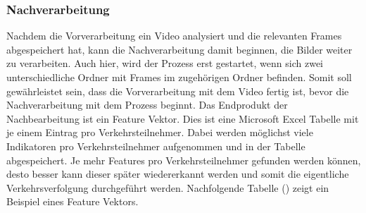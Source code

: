 \subsubsection{Nachverarbeitung}
Nachdem die Vorverarbeitung ein Video analysiert und die relevanten Frames abgespeichert hat, kann die Nachverarbeitung damit beginnen, die Bilder weiter zu verarbeiten. Auch hier, wird der Prozess erst gestartet, wenn sich zwei unterschiedliche Ordner mit Frames im zugehörigen Ordner befinden. Somit soll gewährleistet sein, dass die Vorverarbeitung mit dem Video fertig ist, bevor die Nachverarbeitung mit dem Prozess beginnt. Das Endprodukt der Nachbearbeitung ist ein Feature Vektor. Dies ist eine Microsoft Excel Tabelle mit je einem Eintrag pro Verkehrsteilnehmer. Dabei werden möglichst viele Indikatoren pro Verkehrsteilnehmer aufgenommen und in der Tabelle abgespeichert. Je mehr Features pro Verkehrsteilnehmer gefunden werden können, desto besser kann dieser später wiedererkannt werden und somit die eigentliche Verkehrsverfolgung durchgeführt werden. Nachfolgende Tabelle () zeigt ein Beispiel eines Feature Vektors.

\setlength\tabcolsep{5pt}

